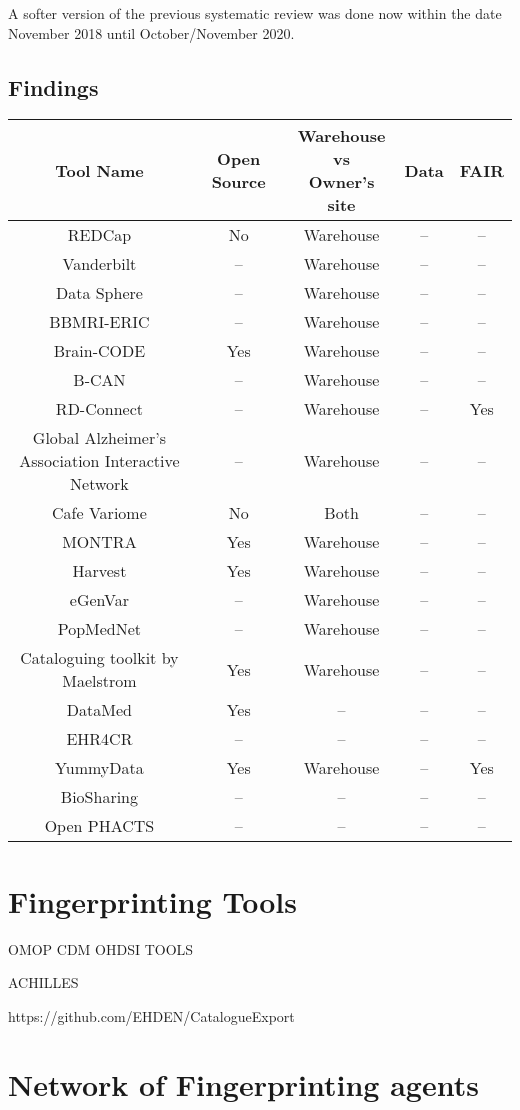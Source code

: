 A softer version of the previous systematic review was done now within the date
November 2018 until October/November 2020.

\subsection{Findings}

\begin{tabular}{ | c | c | c | c | c | }
\hline 
Tool Name & Open Source & \makecell{Warehouse \\ vs \\ Owner's site}  & Data & FAIR\\
\hline
REDCap \cite{redcap} & No & Warehouse & -- & -- \\
\hline
Vanderbilt \cite{vanderbilt} & -- & Warehouse & -- & -- \\
\hline
Data Sphere \cite{datasphere} & -- & Warehouse & -- & -- \\
\hline
BBMRI-ERIC \cite{bbmrieric} & -- & Warehouse & -- & -- \\
\hline
Brain-CODE \cite{braincode} & Yes & Warehouse & -- & -- \\
\hline
B-CAN \cite{bcan} & -- & Warehouse & -- & -- \\
\hline
RD-Connect \cite{rdconnect} & -- & Warehouse & -- & Yes \\
\hline
\makecell{Global Alzheimer's \\Association Interactive\\ Network} \cite{gaain} & -- & Warehouse & -- & -- \\
\hline
Cafe Variome \cite{cafevariome} & No & Both & -- & -- \\
\hline
MONTRA \cite{montra} & Yes & Warehouse & -- & -- \\
\hline
Harvest \cite{harvest} & Yes & Warehouse & -- & -- \\
\hline
eGenVar \cite{egenvar} & -- & Warehouse & -- & -- \\
\hline
PopMedNet \cite{popmednet} & -- & Warehouse & -- & -- \\
\hline
Cataloguing toolkit by Maelstrom \cite{maelstrom} & Yes & Warehouse & -- & -- \\
\hline
DataMed \cite{datamed} & Yes & -- & -- & -- \\
\hline
EHR4CR \cite{ehr4cr} & -- & -- & -- & -- \\
\hline
YummyData \cite{yummydata} & Yes & Warehouse & -- & Yes \\
\hline
BioSharing \cite{biosharing} & -- & -- & -- & -- \\
\hline
Open PHACTS \cite{phacts} & -- & -- & -- & -- \\
\hline
\end{tabular}

\section{Fingerprinting Tools}

OMOP CDM
OHDSI TOOLS 

ACHILLES

https://github.com/EHDEN/CatalogueExport

\section{Network of Fingerprinting agents}
